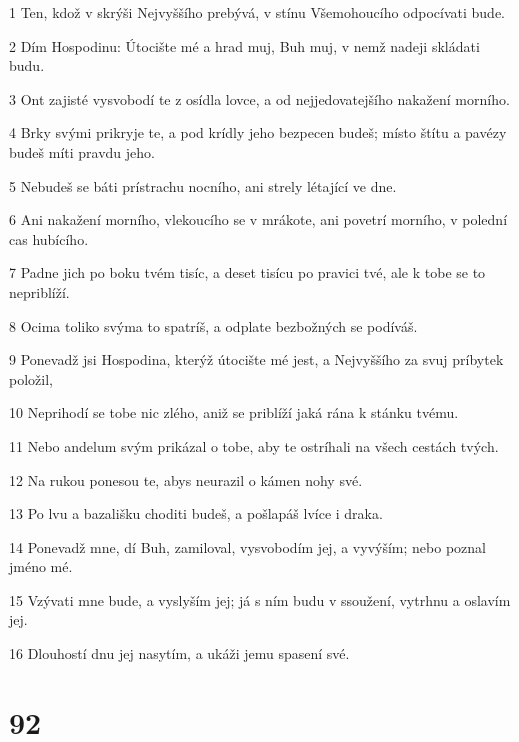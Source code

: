 \par 1 Ten, kdož v skrýši Nejvyššího prebývá, v stínu Všemohoucího odpocívati bude.
\par 2 Dím Hospodinu: Útocište mé a hrad muj, Buh muj, v nemž nadeji skládati budu.
\par 3 Ont zajisté vysvobodí te z osídla lovce, a od nejjedovatejšího nakažení morního.
\par 4 Brky svými prikryje te, a pod krídly jeho bezpecen budeš; místo štítu a pavézy budeš míti pravdu jeho.
\par 5 Nebudeš se báti prístrachu nocního, ani strely létající ve dne.
\par 6 Ani nakažení morního, vlekoucího se v mrákote, ani povetrí morního, v polední cas hubícího.
\par 7 Padne jich po boku tvém tisíc, a deset tisícu po pravici tvé, ale k tobe se to nepriblíží.
\par 8 Ocima toliko svýma to spatríš, a odplate bezbožných se podíváš.
\par 9 Ponevadž jsi Hospodina, kterýž útocište mé jest, a Nejvyššího za svuj príbytek položil,
\par 10 Neprihodí se tobe nic zlého, aniž se priblíží jaká rána k stánku tvému.
\par 11 Nebo andelum svým prikázal o tobe, aby te ostríhali na všech cestách tvých.
\par 12 Na rukou ponesou te, abys neurazil o kámen nohy své.
\par 13 Po lvu a bazališku choditi budeš, a pošlapáš lvíce i draka.
\par 14 Ponevadž mne, dí Buh, zamiloval, vysvobodím jej, a vyvýším; nebo poznal jméno mé.
\par 15 Vzývati mne bude, a vyslyším jej; já s ním budu v ssoužení, vytrhnu a oslavím jej.
\par 16 Dlouhostí dnu jej nasytím, a ukáži jemu spasení své.

\chapter{92}

